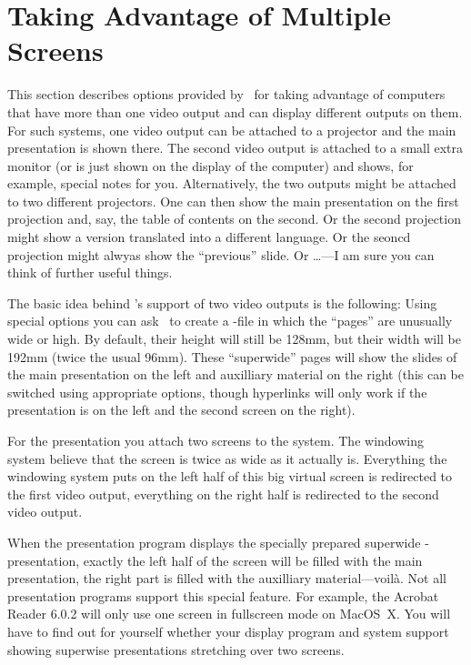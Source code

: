 %
%
%



\section{Taking Advantage of Multiple Screens}

\label{section-twoscreens}

This section describes options provided by \beamer\ for taking
advantage of computers that have more than one video output and
can display different outputs on them. For such systems, one video
output can be attached to a projector and the main presentation is
shown there. The second video output is attached to a small extra
monitor (or is just shown on the display of the computer) and shows,
for example, special notes for you. Alternatively, the two outputs
might be attached to two different projectors. One can then show the
main presentation on the first projection and, say, the table of
contents on the second. Or the second projection might show a version
translated into a different language. Or the seoncd projection might
alwyas show the ``previous'' slide. Or \ldots---I am sure you can
think of further useful things.

The basic idea behind \beamer's support of two video outputs is the
following: Using special options you can ask \beamer\ to create a
\pdf-file in which the ``pages'' are unusually wide or high. By
default, their height will still be 128mm, but their width will be
192mm (twice the usual 96mm). These ``superwide'' pages will show
the slides of the main presentation on the left and auxilliary
material on the right (this can be switched using appropriate
options, though hyperlinks will only work if the presentation is on
the left and the second screen on the right).

For the presentation you attach two screens to the system. The
windowing system believe that the screen is twice as wide as it
actually is. Everything the windowing system puts on the left half of
this big virtual screen is redirected to the first video output,
everything on the right half is redirected to the second video
output.

When the presentation program displays the specially prepared
superwide \beamer-presentation, exactly the left half of the screen
will be filled with the main presentation, the right part is filled
with the auxilliary material---voil\`a. Not all presentation programs
support this special feature. For example, the Acrobat Reader 6.0.2 will
only use one screen in fullscreen mode on MacOS~X. You will have to
find out for yourself whether your display program and system support
showing superwise presentations stretching over two screens.

